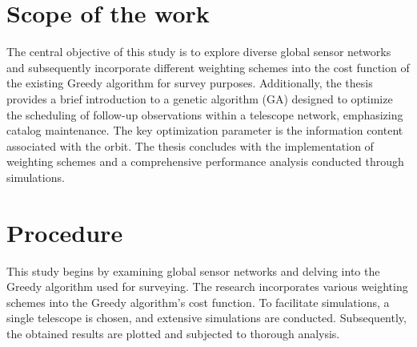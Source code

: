 \section{Scope of the work}

The central objective of this study is to explore diverse global sensor networks and subsequently incorporate different weighting schemes into the cost function of the existing Greedy algorithm for survey purposes. Additionally, the thesis provides a brief introduction to a genetic algorithm (GA) designed to optimize the scheduling of follow-up observations within a telescope network, emphasizing catalog maintenance. 
The key optimization parameter is the information content associated with the orbit.  The thesis concludes with the implementation of weighting schemes and a comprehensive performance analysis conducted through simulations.

\section{Procedure}
This study begins by examining global sensor networks and delving into the Greedy algorithm used for surveying. The research incorporates various weighting schemes into the Greedy algorithm's cost function. 
To facilitate simulations, a single telescope is chosen, and extensive simulations are conducted. Subsequently, the obtained results are plotted and subjected to thorough analysis.
